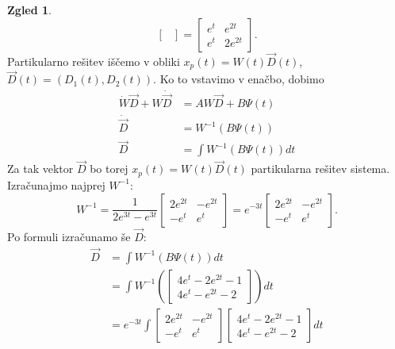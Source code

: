 \documentclass[12pt,a4paper]{amsart}
\theoremstyle{definition} %
\newtheorem{zgled}[definicija]{Zgled}
\theoremstyle{plain} %
\begin{document}
\begin{zgled}
\[\begin{bmatrix}
    \end{bmatrix}
    =\begin{bmatrix}
        e^t & e^{2t} \\
        e^t & 2e^{2t} 
    \end{bmatrix}.\]
    Partikularno rešitev iščemo v obliki $x_p(t)=W(t)\vec{D}(t)$, $\vec{D}(t)=(D_1(t),D_2(t)).$ Ko to vstavimo v enačbo, dobimo 
    \begin{equation*}
        \begin{split}
            \dot{W}\vec{D}+W\dot{\vec{D}} &= AW\vec{D}+B\Psi(t) \\
            \dot{\vec{D}}&=W^{-1}(B\Psi(t)) \\
            \vec{D} &=\int W^{-1}(B\Psi(t))dt
        \end{split}
    \end{equation*}
    \overfullrule=0mm Za tak vektor $\vec{D}$ bo torej $x_p(t)=W(t)\vec{D}(t)$ partikularna rešitev sistema.
    Izračunajmo najprej $W^{-1}$:
    \[W^{-1}=\frac{1}{2e^{3t}-e^{3t}}\begin{bmatrix}
        2e^{2t} & -e^{2t} \\
        -e^t & e^t
    \end{bmatrix}=e^{-3t}\begin{bmatrix}
        2e^{2t} & -e^{2t} \\
        -e^t & e^t
    \end{bmatrix}.\] 
    Po formuli izračunamo še $\vec{D}$:
    \begin{equation*}
        \begin{split}
            \vec{D} &=\int W^{-1}(B\Psi(t))dt \\
                    &= \int W^{-1}(\begin{bmatrix}
                        4e^{t}-2e^{2t}-1  \\
                        4e^{t}-e^{2t}-2  
                    \end{bmatrix})dt \\
                    &= e^{-3t} \int \begin{bmatrix}
                        2e^{2t} & -e^{2t} \\
                        -e^t & e^t
                    \end{bmatrix} \begin{bmatrix}
                        4e^{t}-2e^{2t}-1  \\
                        4e^{t}-e^{2t}-2  
                    \end{bmatrix} dt \\

\end{split}
\end{equation*}
\end{zgled}
\end{document}
